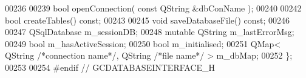 \begin{DoxyCode}
00236 
00239   \textcolor{keywordtype}{bool} openConnection( \textcolor{keyword}{const} QString &dbConName );
00240 
00242   \textcolor{keywordtype}{bool} createTables() \textcolor{keyword}{const};
00243 
00245   \textcolor{keywordtype}{void} saveDatabaseFile() \textcolor{keyword}{const};
00246 
00247   QSqlDatabase    m\_sessionDB;
00248   \textcolor{keyword}{mutable} QString m\_lastErrorMsg;
00249   \textcolor{keywordtype}{bool}            m\_hasActiveSession;
00250   \textcolor{keywordtype}{bool}            m\_initialised;
00251   QMap< QString \textcolor{comment}{/*connection name*/}, QString \textcolor{comment}{/*file name*/} > m\_dbMap;
00252 \};
00253 
00254 \textcolor{preprocessor}{#endif // GCDATABASEINTERFACE\_H}
\end{DoxyCode}
